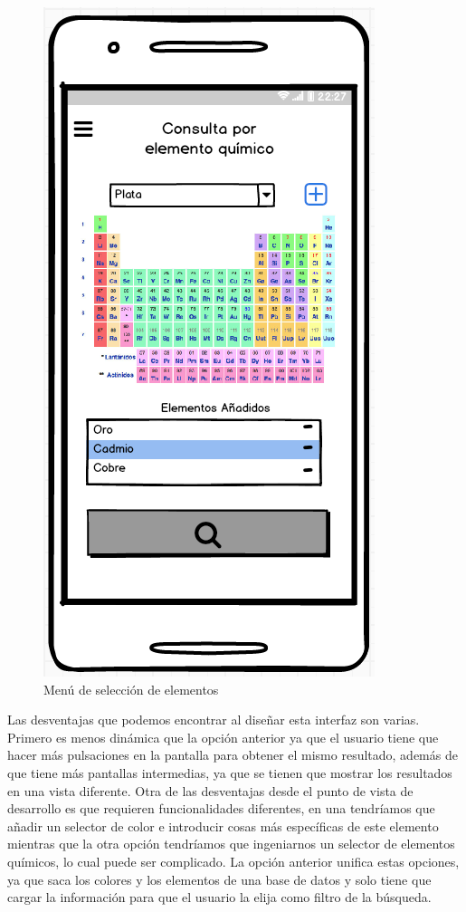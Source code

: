 \begin{multicols}{2}
    \begin{figure}[H]
    \centering
    \includegraphics[scale=0.6]{imagenes/diseno/porElemento.png}
    \caption{Menú de selección de elementos}
    \label{fig:consultaElementos1}
    \end{figure}
\end{multicols}

Las desventajas que podemos encontrar al diseñar esta interfaz son varias. Primero es menos dinámica que la opción anterior ya que el usuario tiene que hacer más pulsaciones en la pantalla para obtener el mismo resultado, además de que tiene más pantallas intermedias, ya que se tienen que mostrar los resultados en una vista diferente. Otra de las desventajas desde el punto de vista de desarrollo es que requieren funcionalidades diferentes, en una tendríamos que añadir un selector de color e introducir cosas más específicas de este elemento mientras que la otra opción tendríamos que ingeniarnos un selector de elementos químicos, lo cual puede ser complicado. La opción anterior unifica estas opciones, ya que saca los colores y los elementos de una base de datos y solo tiene que cargar la información para que el usuario la elija como filtro de la búsqueda. 

